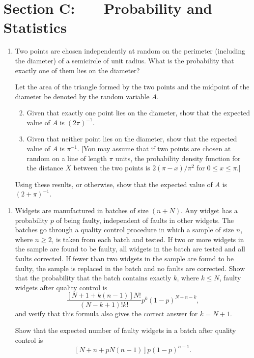 \documentclass[a4, 11pt]{report}
\newlength{\qspace}
\newcounter{qnumber}
\newenvironment{question}%
 {\vspace{\qspace}
  \begin{enumerate}[\bfseries 1\quad][10]%
    \setcounter{enumi}{\value{qnumber}}%
    \item%
 }
{
  \end{enumerate}
  \filbreak
  \stepcounter{qnumber}
 }
\newenvironment{questionparts}[1][1]%
 {
  \begin{enumerate}[\bfseries (i)]%
    \setcounter{enumii}{#1}
    \addtocounter{enumii}{-1}
    \setlength{\itemsep}{5mm}
    \setlength{\parskip}{8pt}
 }
 {
  \end{enumerate}
 }
\begin{document}
	\newpage
\section*{Section C: \ \ \ Probability and Statistics}


\begin{question}
Two points are chosen independently at random on the perimeter (including
the diameter) of a semicircle of unit radius. What is the probability
that exactly one of them lies on the diameter?


Let the area of the triangle formed by the two points and the midpoint
of the diameter be denoted by the random variable $A$. 
\begin{questionparts}
\item Given that exactly one point lies on the diameter, show that the expected
value of $A$ is \nolinebreak $\left(2\pi\right)^{-1}$. 
\item Given that neither point lies on the diameter, show that the expected
value of $A$ is $\pi^{-1}$. {[}You may assume that if two points
are chosen at random on a line of length $\pi$ units, the probability
density function for the distance $X$ between the two points is $2\left(\pi-x\right)/\pi^{2}$
for $0\leqslant x\leqslant\pi.${]}
\end{questionparts}

Using these results, or otherwise, show that the expected value of
$A$ is $\left(2+\pi\right)^{-1}$. 
\end{question}

\begin{question}
Widgets are manufactured in batches of size $(n+N)$. Any widget has
a probability $p$ of being faulty, independent of faults in other
widgets. The batches go through a quality control procedure in which
a sample of size $n$, where $n\geqslant2$, is taken from each batch
and tested. If two or more widgets in the sample are found to be faulty,
all widgets in the batch are tested and all faults corrected. If fewer
than two widgets in the sample are found to be faulty, the sample
is replaced in the batch and no faults are corrected. Show that the
probability that the batch contains exactly $k$, where $k\leqslant N$,
faulty widgets after quality control is 
\[
\frac{\left[N+1+k\left(n-1\right)\right]N!}{\left(N-k+1\right)!k!}p^{k}\left(1-p\right)^{N+n-k},
\]
and verify that this formula also gives the correct answer for $k=N+1$. 


Show that the expected number of faulty widgets in a batch after quality
control is 
\[
\left[N+n+pN(n-1)\right]p(1-p)^{n-1}.
\]
\end{question}
\end{document}
